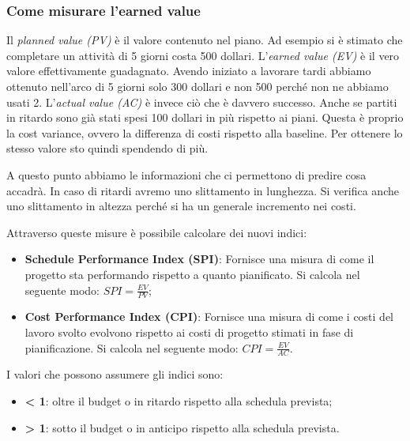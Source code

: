 \subsubsection{Come misurare l'earned value}
Il \textit{planned value (PV)} è il valore contenuto nel piano. Ad esempio si è stimato che completare un attività di 5 giorni costa 500 dollari.\newline
L'\textit{earned value (EV)} è il vero valore effettivamente guadagnato. Avendo iniziato a lavorare tardi abbiamo ottenuto nell'arco di 5 giorni solo 300 dollari e non 500 perché non ne abbiamo usati 2.\newline
L'\textit{actual value (AC)} è invece ciò che è davvero successo. Anche se partiti in ritardo sono già stati spesi 100 dollari in più rispetto ai piani. Questa è proprio la cost variance, ovvero la differenza di costi rispetto alla baseline. Per ottenere lo stesso valore sto quindi spendendo di più.

\noindent A questo punto abbiamo le informazioni che ci permettono di predire cosa accadrà. In caso di ritardi avremo uno slittamento in lunghezza. Si verifica anche uno slittamento in altezza perché si ha un generale incremento nei costi.

\noindent Attraverso queste misure è possibile calcolare dei nuovi indici:
\begin{itemize}
	\item \textbf{Schedule Performance Index (SPI)}: Fornisce una misura di come il progetto sta performando rispetto a quanto pianificato. Si calcola nel seguente modo: $SPI = \frac{EV}{PV}$;
	\item \textbf{Cost Performance Index (CPI)}: Fornisce una misura di come i costi del lavoro svolto evolvono rispetto ai costi di progetto stimati in fase di pianificazione. Si calcola nel seguente modo: $CPI = \frac{EV}{AC}$.
\end{itemize}
I valori che possono assumere gli indici sono:
\begin{itemize}
	\item \textbf{< 1}: oltre il budget o in ritardo rispetto alla schedula prevista;
	\item \textbf{> 1}: sotto il budget o in anticipo rispetto alla schedula prevista.
\end{itemize}

